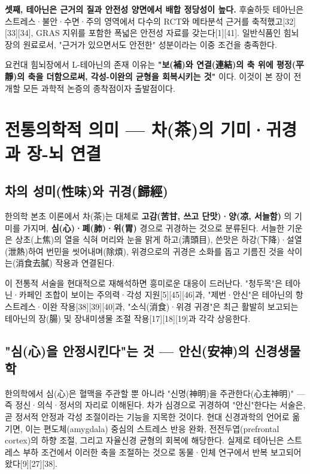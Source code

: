 \documentclass[11pt,oneside]{book}
\begin{document}
\textbf{셋째, 테아닌은 근거의 질과 안전성 양면에서 배합 정당성이 높다.} 후술하듯 테아닌은 스트레스·불안·수면·주의 영역에서 다수의 RCT와 메타분석 근거를 축적했고[32][33][34], GRAS 지위를 포함한 폭넓은 안전성 자료를 갖는다[1][41]. 일반식품인 힘뇌장의 원료로서, "근거가 있으면서도 안전한" 성분이라는 이중 조건을 충족한다.

요컨대 힘뇌장에서 L-테아닌의 존재 이유는 \textbf{"보(補)와 연결(連結)의 축 위에 평정(平靜)의 축을 더함으로써, 각성-이완의 균형을 회복시키는 것"} 이다. 이것이 본 장이 전개할 모든 과학적 논증의 종착점이자 출발점이다.

\section{전통의학적 의미 — 차(茶)의 기미·귀경과 장-뇌 연결}
\subsection{차의 성미(性味)와 귀경(歸經)}
한의학 본초 이론에서 차(茶)는 대체로 \textbf{고감(苦甘, 쓰고 단맛)·양(凉, 서늘함)} 의 기미를 가지며, \textbf{심(心)·폐(肺)·위(胃)} 경으로 귀경하는 것으로 분류된다. 서늘한 기운은 상초(上焦)의 열을 식혀 머리와 눈을 맑게 하고(淸頭目), 쓴맛은 하강(下降)·설열(泄熱)하여 번민을 씻어내며(除煩), 위경으로의 귀경은 소화를 돕고 기름진 것을 삭이는(消食去膩) 작용과 연결된다.

이 전통적 서술을 현대적으로 재해석하면 흥미로운 대응이 드러난다. "청두목"은 테아닌·카페인 조합이 보이는 주의력·각성 지원[5][45][46]과, "제번·안신"은 테아닌의 항스트레스·이완 작용[38][39][40]과, "소식(消食)·위경 귀경"은 최근 활발히 보고되는 테아닌의 장(腸) 및 장내미생물 조절 작용[17][18][19]과 각각 상응한다.

\subsection{"심(心)을 안정시킨다"는 것 — 안신(安神)의 신경생물학}
한의학에서 심(心)은 혈맥을 주관할 뿐 아니라 "신명(神明)을 주관한다(心主神明)" — 즉 정신·의식·정서의 자리로 이해된다. 차가 심경으로 귀경하여 "안신"한다는 서술은, 곧 정서적 안정과 각성 조절이라는 기능을 지목한 것이다. 현대 신경과학의 언어로 옮기면, 이는 편도체(amygdala) 중심의 스트레스 반응 완화, 전전두엽(prefrontal cortex)의 하향 조절, 그리고 자율신경 균형의 회복에 해당한다. 실제로 테아닌은 스트레스 부하 조건에서 이러한 축을 조절하는 것으로 동물·인체 연구에서 반복 보고되어 왔다[9][27][38].
\end{document}
